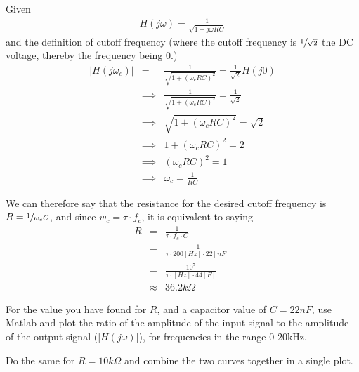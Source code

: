 \documentclass{../../myassignment}
\begin{document}
	\begin{answer}
		Given
		\begin{eqnarray*}
			H(j\omega) = \frac{1}{\sqrt{1+j\omega RC}}
		\end{eqnarray*}
		and the definition of cutoff frequency (where the cutoff frequency is $\sfrac{1}{\sqrt2}$ the DC voltage, thereby the frequency being $0$.)
		\begin{eqnarray*}
			|H(j\omega_c)| &=& \frac{1}{\sqrt{1+(\omega_c RC)^2}} = \frac{1}{\sqrt2}H(j0) \\
			&\implies& \frac{1}{\sqrt{1+(\omega_c RC)^2}} = \frac{1}{\sqrt2} \\
			&\implies& \sqrt{1+(\omega_c RC)^2} = \sqrt2 \\
			&\implies& 1+(\omega_c RC)^2 = 2 \\
			&\implies& (\omega_c RC)^2 = 1 \\
			&\implies& \omega_c = \frac{1}{RC}
		\end{eqnarray*}

		We can therefore say that the resistance for the desired cutoff frequency is $R = \sfrac{1}{w_c C}$, and since $w_c = \tau \cdot f_c$, it is equivalent to saying 
		\begin{eqnarray*}
			R &=& \frac{1}{\tau \cdot f_c \cdot C} \\
			  &=& \frac{1}{\tau \cdot 200[Hz] \cdot 22[nF]} \\
			  &=& \frac{10^7}{\tau \cdot [Hz] \cdot 44[F]} \\
			  &\approx& 36.2k\Omega
		\end{eqnarray*}
	\end{answer}

	\newpage

	\begin{problem}
		For the value you have found for $R$, and a capacitor value of $C=22nF$, use Matlab and plot the ratio of the amplitude of the input signal to the amplitude of the output signal ($|H(j\omega)|$), for frequencies in the range 0-20kHz.
	\end{problem}

	\begin{problem}
		Do the same for $R= 10k\Omega$ and combine the two curves together in a single plot.
	\end{problem}
\end{document}
